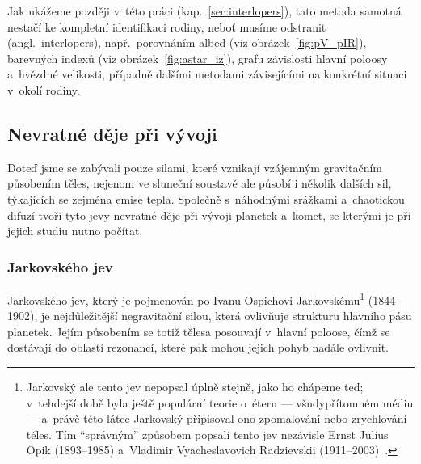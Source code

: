 \documentclass[A4paper, 12pt, oneside]{book}
\begin{document}
Jak ukážeme později v~této práci (kap.~\ref{sec:interlopers}), tato metoda samotná nestačí ke kompletní identifikaci rodiny, neboť musíme odstranit  (angl.\ interlopers), např.\ porovnáním albed (viz obrázek~\ref{fig:pV_pIR}), barevných indexů (viz obrázek~\ref{fig:astar_iz}), grafu závislosti hlavní poloosy a~hvězdné velikosti, případně dalšími metodami závisejícími na konkrétní situaci v~okolí rodiny.

\subsection{Nevratné děje při vývoji}

Doteď jsme se zabývali pouze silami, které vznikají vzájemným gravitačním působením těles, nejenom ve sluneční soustavě ale působí i několik dalších sil, týkajících se zejména emise tepla. Společně s~náhodnými srážkami a~chaotickou difuzí tvoří tyto jevy nevratné děje při vývoji planetek a~komet, se kterými je při jejich studiu nutno počítat.

\subsubsection{Jarkovského jev} \label{sec:jarko}
Jarkovského jev, který je pojmenován po Ivanu Ospichovi Jarkovskému\footnote{Jarkovský ale tento jev nepopsal úplně stejně, jako ho chápeme teď; v~tehdejší době byla ještě populární teorie o~éteru --- všudypřítomném médiu --- a~právě této látce Jarkovský připisoval ono zpomalování nebo zrychlování těles. Tím \enquote{správným} způsobem popsali tento jev nezávisle Ernst Julius Öpik (1893--1985) a~Vladimir Vyacheslavovich Radzievskii (1911--2003)~\cite{brozphd}.}  (1844--1902), je nejdůležitější negravitační silou, která ovlivňuje strukturu hlavního pásu planetek. Jejím působením se totiž tělesa posouvají v~hlavní poloose, čímž se dostávají do oblastí rezonancí, které pak mohou jejich pohyb nadále ovlivnit.
\end{document}
